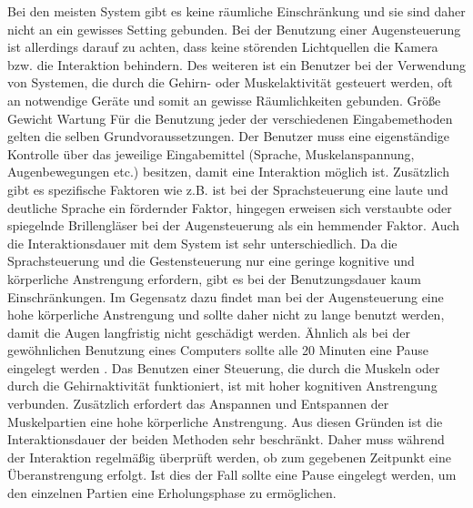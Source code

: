 \newline \newline \newline \newline
Bei den meisten System gibt es keine räumliche Einschränkung und sie sind daher nicht an ein gewisses Setting gebunden. Bei der Benutzung einer Augensteuerung ist allerdings darauf zu achten, dass keine störenden Lichtquellen die Kamera bzw. die Interaktion behindern. Des weiteren ist ein Benutzer bei der Verwendung von Systemen, die durch die Gehirn- oder Muskelaktivität gesteuert werden, oft an notwendige Geräte und somit an gewisse Räumlichkeiten gebunden.
\newline \newline
Größe
\newline \newline
Gewicht
\newline \newline
Wartung
\newline \newline
Für die Benutzung jeder der verschiedenen Eingabemethoden gelten die selben Grundvoraussetzungen. Der Benutzer muss eine eigenständige Kontrolle über das jeweilige Eingabemittel (Sprache, Muskelanspannung, Augenbewegungen etc.) besitzen, damit eine Interaktion möglich ist. Zusätzlich gibt es spezifische Faktoren wie z.B. ist bei der Sprachsteuerung eine laute und deutliche Sprache ein fördernder Faktor, hingegen erweisen sich verstaubte oder spiegelnde Brillengläser bei der Augensteuerung als ein hemmender Faktor.
\newline \newline
Auch die Interaktionsdauer mit dem System ist sehr unterschiedlich. Da die Sprachsteuerung und die Gestensteuerung nur eine geringe kognitive und körperliche Anstrengung erfordern, gibt es bei der Benutzungsdauer kaum Einschränkungen. Im Gegensatz dazu findet man bei der Augensteuerung eine hohe körperliche Anstrengung und sollte daher nicht zu lange benutzt werden, damit die Augen langfristig nicht geschädigt werden. Ähnlich als bei der gewöhnlichen Benutzung eines Computers sollte alle 20 Minuten eine Pause eingelegt werden \cite{20Methode}. Das Benutzen einer Steuerung, die durch die Muskeln oder durch die Gehirnaktivität funktioniert, ist mit hoher kognitiven Anstrengung verbunden. Zusätzlich erfordert das Anspannen und Entspannen der Muskelpartien eine hohe körperliche Anstrengung. Aus diesen Gründen ist die Interaktionsdauer der beiden Methoden sehr beschränkt. Daher muss während der Interaktion regelmäßig überprüft werden, ob zum gegebenen Zeitpunkt eine Überanstrengung erfolgt. Ist dies der Fall sollte eine Pause eingelegt werden, um den einzelnen Partien eine Erholungsphase zu ermöglichen.
